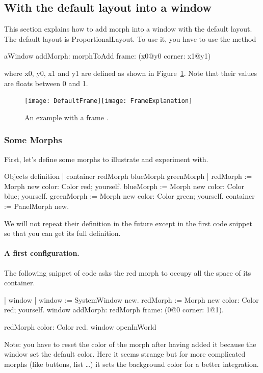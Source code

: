 \documentclass[a4paper,10pt,twoside]{book}
\begin{document}
\subsection{With the default layout into a window}

This section  explains how to add morph into a window with the default layout.
The default layout is ProportionalLayout. To use it, you have to use the method 
\begin{code}{}
aWindow
	addMorph: morphToAdd
	frame: (x0@y0 corner: x1@y1)
\end{code}
where x0, y0, x1 and y1 are defined as shown in  Figure~\ref{fig:frameExplanation}. Note that their values are floats between 0 and 1.

\begin{figure}[ht]\centering
	\texttt{[image: DefaultFrame]}\texttt{[image: FrameExplanation]}
	\caption{An example with a frame .}
	\label{fig:frameExplanation}
\end{figure}

\subsubsection{Some Morphs}
First, let's define some morphs to illustrate and experiment with.
\begin{code}{Objects definition}
| container redMorph blueMorph greenMorph |
redMorph := Morph new color: Color red; yourself.				
blueMorph := Morph new color: Color blue; yourself.
greenMorph := Morph new  color: Color green; yourself.
container := PanelMorph new.
\end{code}

We will not repeat their definition in the future except in the first code snippet so that you can 
get its full definition. 

\paragraph{A first configuration.}
The following snippet of code asks the red morph to occupy all the space of its container.
\begin{code}{}
| window |
window := SystemWindow new.
redMorph := Morph new color: Color red; yourself.	
window
	addMorph: redMorph
	frame: (0@0 corner: 1@1).
	
redMorph color: Color red.	
window openInWorld
\end{code}
Note: you have to reset the color of the morph after having added it because the window set the default color. Here it seems strange but for more complicated morphs (like buttons, list \dots) it sets the background color for a better integration.
\end{document}
